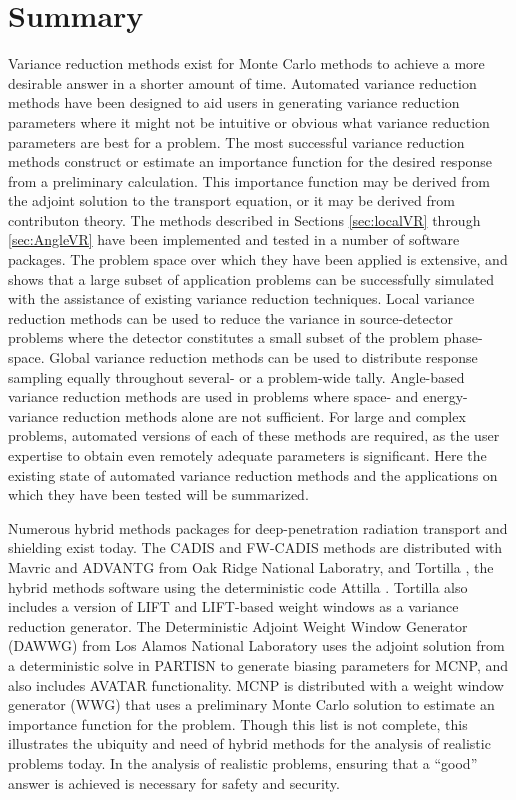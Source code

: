 \section{Summary}
\label{sec:litsummary}

Variance reduction methods exist for Monte Carlo methods to
achieve a more desirable answer in a
shorter amount of time. Automated variance reduction methods have been designed
to aid users in generating variance reduction parameters where it might not be
intuitive or obvious what variance reduction parameters are best for a problem.
The most successful variance reduction methods construct or estimate an
importance function for the desired response from a preliminary calculation.
This importance function may be derived from the adjoint solution to the
transport equation, or it may be derived from contributon theory.
The methods described in Sections \ref{sec:localVR} through \ref{sec:AngleVR}
have been implemented and tested in a number of software packages. The problem
space over which they have been applied is extensive, and shows that a large
subset of application problems can be successfully simulated with the assistance
of existing variance reduction techniques. Local variance reduction methods can
be used to reduce the variance in source-detector problems where the detector
constitutes a small subset of the problem phase-space. Global variance reduction
methods can be used to distribute response sampling equally throughout several-
or a problem-wide tally. Angle-based variance reduction methods are used in
problems where space- and energy- variance reduction methods alone are not
sufficient. For large and complex problems, automated versions of each of these
methods are required, as the user expertise to obtain even remotely adequate
parameters is significant. Here the existing state of automated variance
reduction methods and the applications on which they have been tested will be
summarized.

Numerous hybrid methods packages for deep-penetration radiation transport and
shielding exist today.
The CADIS and FW-CADIS methods are distributed with Mavric \cite{SCALE6_1,
peplow_advanced_2007} and
ADVANTG \cite{mosher_automated_2009} from Oak Ridge National Laboratry, and Tortilla
\cite{somasundaram_implementation_2013},
the hybrid methods software using the deterministic code Attilla
\cite{lucas_applications_2004}. Tortilla also includes a version of LIFT and
LIFT-based weight windows as a variance reduction generator.
The Deterministic Adjoint Weight Window
Generator (DAWWG) from Los Alamos National Laboratory
\cite{sweezy_automated_2005} uses the adjoint solution
from a deterministic solve in
PARTISN \cite{alcouffe_partisn_2002}
to generate biasing parameters for MCNP, and also includes AVATAR
functionality. MCNP \cite{mcnp_manual_v1} is distributed with a weight window
generator (WWG) that uses a preliminary Monte Carlo solution to estimate an
importance function for the problem. Though this list is not complete, this
illustrates the ubiquity and need of hybrid methods for the analysis of
realistic problems today. In the analysis of realistic problems, ensuring that a
``good'' answer is achieved is necessary for safety and security.

